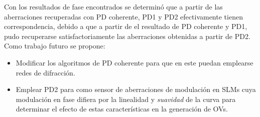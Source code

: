 Con los resultados de fase encontrados se determinó que a partir de las aberraciones recuperadas con PD coherente, PD1 y PD2 efectivamente tienen correspondencia, debido a que a partir de el resultado de PD coherente y PD1, pudo recuperarse satisfactoriamente las aberraciones obtenidas a partir de PD2.\\

Como trabajo futuro se propone:

\begin{itemize}
\item Modificar los algoritmos de PD coherente para que en este puedan emplearse redes de difracción.
\item Emplear PD2 para como sensor de aberraciones de modulación en SLMs cuya modulación en fase difiera por la linealidad y \textit{suavidad} de la curva para determinar el efecto de estas características en la generación de OVs.
\end{itemize} 